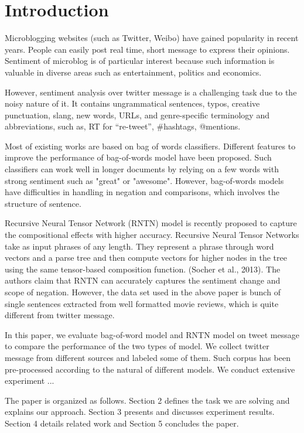 \section{Introduction}

Microblogging websites (such as Twitter, Weibo) have gained popularity in recent years. People can easily post real time, short message to express their opinions. 
Sentiment of microblog is of particular interest because such information is valuable in diverse areas such as entertainment, politics and economics.

However, sentiment analysis over twitter message is a challenging task due to the noisy nature of it. 
It contains ungrammatical sentences, typos, creative punctuation, slang, new words, URLs, and genre-specific terminology and abbreviations, such as, RT for “re-tweet”, \#hashtags, @mentions. 

Most of existing works are based on bag of words classifiers. Different features to improve the performance of bag-of-words model have been proposed. Such classifiers can work well in longer documents by relying on a few words with strong sentiment such as "great" or "awesome". However, bag-of-words models have difficulties in handling in negation and comparisons, which involves the structure of sentence. 

Recursive Neural Tensor Network (RNTN) model is recently proposed to capture the compositional effects with higher accuracy. Recursive Neural Tensor Networks take as input phrases of any length. They represent a phrase through word vectors and a parse tree and then compute vectors for higher nodes in the tree using the same tensor-based composition function. (Socher et al., 2013). The authors claim that RNTN can accurately captures the sentiment change and scope of negation. However, the data set used in the above paper is bunch of single sentences extracted from well formatted movie reviews, which is quite different from twitter message. 

In this paper, we evaluate bag-of-word model and RNTN model on tweet message to compare the performance of the two types of model. We collect twitter message from different sources and labeled some of them. Such corpus has been pre-processed according to the natural of different models. We conduct extensive experiment ...

The paper is organized as follows. Section 2 defines the task we are solving and explains our approach. 
Section 3 presents and discusses experiment results. Section 4 details related work and Section 5 concludes the paper.
\newpage